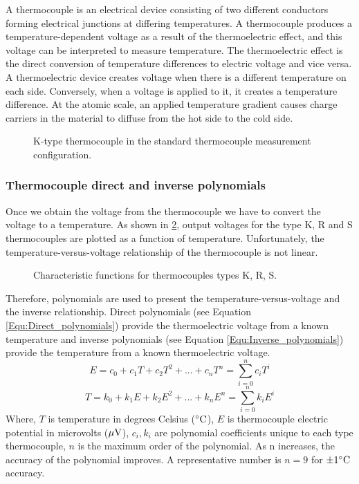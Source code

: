 A thermocouple is an electrical device consisting of two different conductors forming electrical junctions at differing temperatures. A thermocouple produces a temperature-dependent voltage as a result of the thermoelectric effect, and this voltage can be interpreted to measure temperature.
The thermoelectric effect is the direct conversion of temperature differences to electric voltage and vice versa. A thermoelectric device creates voltage when there is a different temperature on each side. Conversely, when a voltage is applied to it, it creates a temperature difference. At the atomic scale, an applied temperature gradient causes charge carriers in the material to diffuse from the hot side to the cold side.
\begin{figure}[!htp]
\centering{}
\caption{K-type thermocouple in the standard thermocouple measurement configuration.}
\label{Fig:Thermocouple_circuit_Ktype_including_voltmeter_temperature}
\end{figure}

\subsubsection{Thermocouple direct and inverse polynomials}
Once we obtain the voltage from the thermocouple we have to convert the voltage to a temperature.
As shown in \ref{Fig:Thermocouples}, output voltages for the type K, R and S thermocouples are plotted as a function of temperature.
Unfortunately, the temperature-versus-voltage relationship of the thermocouple is not linear.
\begin{figure}[!htp]
\centering{}
\caption{Characteristic functions for thermocouples types K, R, S.}
\label{Fig:Thermocouples}
\end{figure}
Therefore, polynomials are used to present the temperature-versus-voltage and the inverse relationship.
Direct polynomials (see Equation \ref{Equ:Direct_polynomials}) provide the thermoelectric voltage from a known temperature and inverse polynomials (see Equation \ref{Equ:Inverse_polynomials}) provide the temperature from a known thermoelectric voltage.
\begin{equation}
\label{Equ:Direct_polynomials}
E = {c_0} + {c_1}T + {c_2}{T^2} + ... + {c_n}{T^n} = \sum\limits_{i = 0}^n {{c_i}{T^i}}
\end{equation}
\begin{equation}
\label{Equ:Inverse_polynomials}
T = {k_0} + {k_1}E + {k_2}{E^2} + ... + {k_n}{E^n} = \sum\limits_{i = 0}^n {{k_i}{E^i}}
\end{equation}
Where, $T$ is temperature in degrees Celsius ($^{\circ} \rm{C}$), $E$ is thermocouple electric potential in microvolts (${\rm{\mu V}}$), $c_i,k_i$ are polynomial coefficients unique to each type thermocouple, $n$ is the maximum order of the polynomial.
As n increases, the accuracy of the polynomial improves.
A representative number is $n = 9$ for $\pm 1 ^{\circ} \rm{C}$ accuracy.

